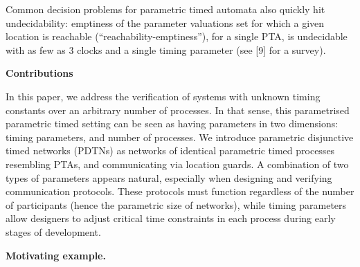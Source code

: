  
 
Common decision problems for parametric timed automata also quickly hit undecidability: emptiness of the parameter valuations set for which a given location is reachable (“reachability-emptiness”), for a single PTA, is undecidable with as few as 3 clocks and a single timing parameter (see [9] for a survey).\par
 
 
 
\par\medskip\noindent\textbf{Contributions}\par
 
 
In this paper, we address the verification of systems with unknown timing constants over an arbitrary number of processes. In that sense, this parametrised parametric timed setting can be seen as having parameters in two dimensions: timing parameters, and number of processes. We introduce parametric disjunctive timed networks (PDTNs) as networks of identical parametric timed processes resembling PTAs, and communicating via location guards. A combination of two types of parameters appears natural, especially when designing and verifying communication protocols. These protocols must function regardless of the number of participants (hence the parametric size of networks), while timing parameters allow designers to adjust critical time constraints in each process during early stages of development.\par
 
 
 
\par\medskip\noindent\textbf{Motivating example.}\par
 
 
